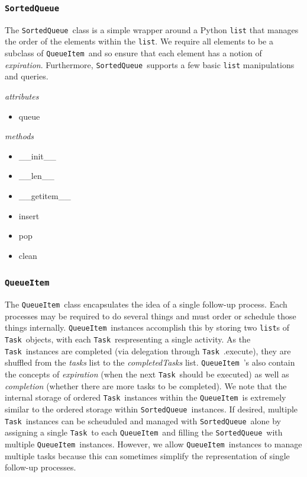 \documentclass{article}
\newcommand{\SortedQueue}{\texttt{SortedQueue}~}
\newcommand{\QueueItem}{\texttt{QueueItem}~}
\newcommand{\Task}{\texttt{Task}~}
\begin{document}

\subsubsection{\SortedQueue}
\label{sec: SortedQueue}

The \SortedQueue class is a simple wrapper around a Python \texttt{list} that manages the order of the elements within the \texttt{list}.
We require all elements to be a subclass of \QueueItem and so ensure that each element has a notion of \textit{expiration}.
Furthermore, \SortedQueue supports a few basic \texttt{list} manipulations and queries.

\noindent
\textit{attributes}

\begin{itemize}
    \item{queue}
\end{itemize}

\noindent
\textit{methods}

\begin{itemize}
    \item{\_\_init\_\_}
    \item{\_\_len\_\_}
    \item{\_\_getitem\_\_}
    \item{insert}
    \item{pop}
    \item{clean}
\end{itemize}



\subsubsection{\QueueItem}
\label{sec: QueueItem}

The \QueueItem class encapsulates the idea of a single follow-up process.
Each processes may be required to do several things and must order or schedule those things internally.
\QueueItem instances accomplish this by storing two \texttt{list}s of \Task objects, with each \Task respresenting a single activity.
As the \Task instances are completed (via delegation through \Task.execute), they are shuffled from the \textit{tasks} list to the \textit{completedTasks} list.
\QueueItem's also contain the concepts of \textit{expiration} (when the next \Task should be executed) as well as \textit{completion} (whether there are more tasks to be completed).
We note that the internal storage of ordered \Task instances within the \QueueItem is extremely similar to the ordered storage within \SortedQueue instances.
If desired, multiple \Task instances can be scheuduled and managed with \SortedQueue alone by assigning a single \Task to each \QueueItem and filling the \SortedQueue with multiple \QueueItem instances.
However, we allow \QueueItem instances to manage multiple tasks because this can sometimes simplify the representation of single follow-up processes.
\end{document}
